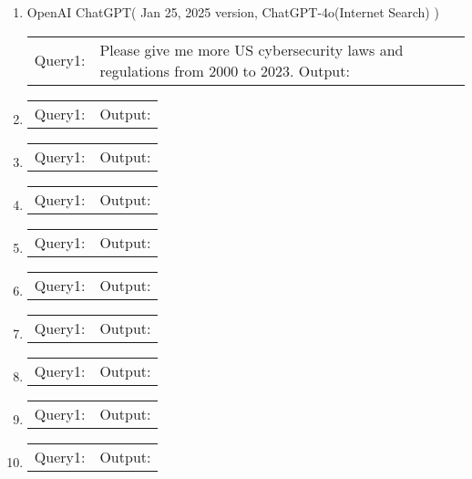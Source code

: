 \begin{enumerate}
    \item OpenAI ChatGPT( Jan 25, 2025 version, ChatGPT-4o(Internet Search) )
    \begin{tabular}{ll}
        Query1: & Please give me more US cybersecurity laws and regulations from 2000 to 2023.
        Output: &
    \end{tabular}

    \item
    \begin{tabular}{ll}
        Query1: &
        Output: &
    \end{tabular}

    \item
    \begin{tabular}{ll}
        Query1: &
        Output: &
    \end{tabular}

    \item
    \begin{tabular}{ll}
        Query1: &
        Output: &
    \end{tabular}

    \item
    \begin{tabular}{ll}
        Query1: &
        Output: &
    \end{tabular}

    \item
    \begin{tabular}{ll}
        Query1: &
        Output: &
    \end{tabular}

    \item
    \begin{tabular}{ll}
        Query1: &
        Output: &
    \end{tabular}

    \item
    \begin{tabular}{ll}
        Query1: &
        Output: &
    \end{tabular}

    \item
    \begin{tabular}{ll}
        Query1: &
        Output: &
    \end{tabular}

    \item
    \begin{tabular}{ll}
        Query1: &
        Output: &
    \end{tabular}

\end{enumerate}
